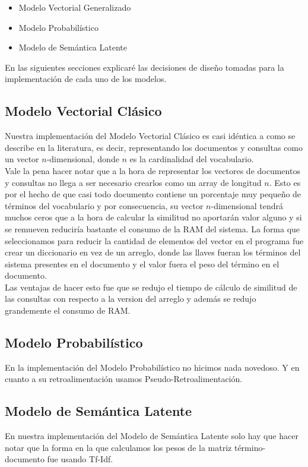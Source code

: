 \documentclass[12pt]{article}
\begin{document}
\begin{itemize}
	\item Modelo Vectorial Generalizado
	\item Modelo Probabilístico
	\item Modelo de Semántica Latente
\end{itemize}

En las siguientes secciones explicaré las decisiones de diseño tomadas para la implementación de cada
uno de los modelos.
\subsection{Modelo Vectorial Clásico}
Nuestra implementación del Modelo Vectorial Clásico es casi idéntica a como se describe en la
literatura, es decir, representando los documentos y consultas como un vector $n$-dimensional, donde
$n$ es la cardinalidad del vocabulario.\\
Vale la pena hacer notar que a la hora de representar los vectores de documentos y consultas no llega a ser
necesario crearlos como un array de longitud $n$. Esto es por el hecho de que casi todo documento contiene un porcentaje muy pequeño de términos del vocabulario y por consecuencia,
su vector $n$-dimensional tendrá muchos ceros que a la hora de calcular la similitud no aportarán valor alguno
y si se remueven reduciría bastante el consumo de la RAM del sistema. La forma que seleccionamos para reducir la cantidad de elementos del vector
en el programa fue crear un diccionario en vez de un arreglo, donde las llaves fueran los términos del sistema presentes en el documento y el valor fuera el peso del término
en el documento.\\
Las ventajas de hacer esto fue que se redujo el tiempo de cálculo de similitud de las consultas con respecto a la version del arreglo y además
se redujo grandemente el consumo de RAM.

\subsection{Modelo Probabilístico}
En la implementación del Modelo Probabilístico no hicimos nada novedoso. Y en cuanto a su retroalimentación usamos
Pseudo-Retroalimentación.

\subsection{Modelo de Semántica Latente}
En nuestra implementación del Modelo de Semántica Latente solo hay que hacer notar que la forma en la que calculamos
los pesos de la matriz término-documento fue usando Tf-Idf.
\end{document}
